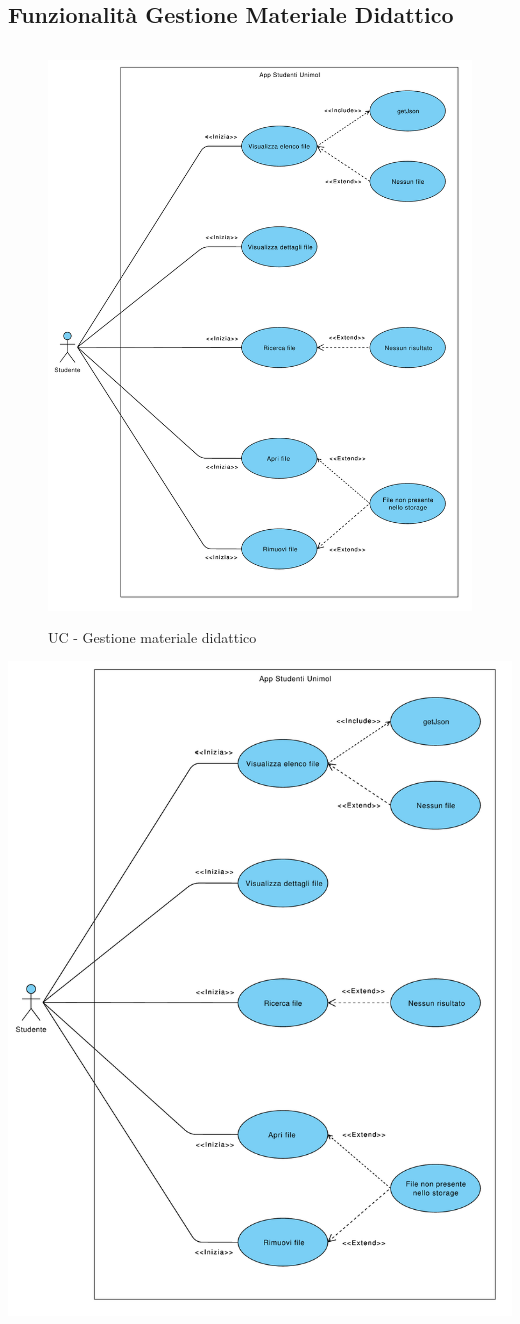 \subsection{Funzionalità Gestione Materiale Didattico}
\begin{figure}[h]
	\includegraphics[width=6.5in, height=6in]{imgs/gruppo1/use_case_diagrams/UCD3-materiale_didattico.pdf}
	\caption{UC - Gestione materiale didattico}
	\label{diag:gestioneMatDidattico}
\end{figure}
\begin{center}
	\includegraphics[width=6.5in]{imgs/gruppo1/use_case_diagrams/UCD3-materiale_didattico.pdf}
\end{center}

\clearpage